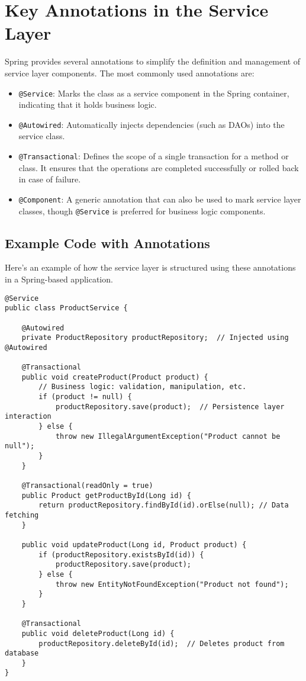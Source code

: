 \documentclass{article}
\begin{document}
\section{Key Annotations in the Service Layer}
Spring provides several annotations to simplify the definition and management of service layer components. The most commonly used annotations are:

\begin{itemize}
    \item \texttt{@Service}: Marks the class as a service component in the Spring container, indicating that it holds business logic.
    \item \texttt{@Autowired}: Automatically injects dependencies (such as DAOs) into the service class.
    \item \texttt{@Transactional}: Defines the scope of a single transaction for a method or class. It ensures that the operations are completed successfully or rolled back in case of failure.
    \item \texttt{@Component}: A generic annotation that can also be used to mark service layer classes, though \texttt{@Service} is preferred for business logic components.
\end{itemize}

\subsection{Example Code with Annotations}
Here's an example of how the service layer is structured using these annotations in a Spring-based application.

\begin{lstlisting}[caption={Service Layer Example with Annotations}]
@Service
public class ProductService {

    @Autowired
    private ProductRepository productRepository;  // Injected using @Autowired

    @Transactional
    public void createProduct(Product product) {
        // Business logic: validation, manipulation, etc.
        if (product != null) {
            productRepository.save(product);  // Persistence layer interaction
        } else {
            throw new IllegalArgumentException("Product cannot be null");
        }
    }

    @Transactional(readOnly = true)
    public Product getProductById(Long id) {
        return productRepository.findById(id).orElse(null); // Data fetching
    }

    public void updateProduct(Long id, Product product) {
        if (productRepository.existsById(id)) {
            productRepository.save(product);
        } else {
            throw new EntityNotFoundException("Product not found");
        }
    }

    @Transactional
    public void deleteProduct(Long id) {
        productRepository.deleteById(id);  // Deletes product from database
    }
}
\end{lstlisting}
\end{document}
